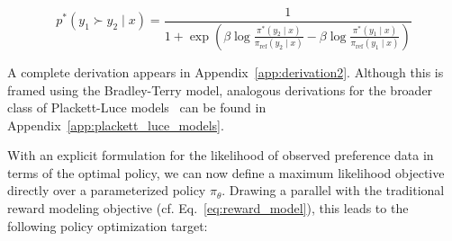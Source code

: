 \begin{equation}\label{eq:objective}
    p^*(y_1\succ y_2 \mid x)=\frac{1}{1 + \exp\left(\beta \log \frac{\pi^*(y_2\mid x)}{\pi_\text{ref}(y_2\mid x)} - \beta \log \frac{\pi^*(y_1\mid x)}{\pi_\text{ref}(y_1\mid x)}\right)}
\end{equation}

A complete derivation appears in Appendix~\ref{app:derivation2}. Although this is framed using the Bradley-Terry model, analogous derivations for the broader class of Plackett-Luce models~\citep{plackett1975analysis, luce2012individual} can be found in Appendix~\ref{app:plackett_luce_models}.

With an explicit formulation for the likelihood of observed preference data in terms of the optimal policy, we can now define a maximum likelihood objective directly over a parameterized policy $\pi_\theta$. Drawing a parallel with the traditional reward modeling objective (cf. Eq.~\ref{eq:reward_model}), this leads to the following policy optimization target:

